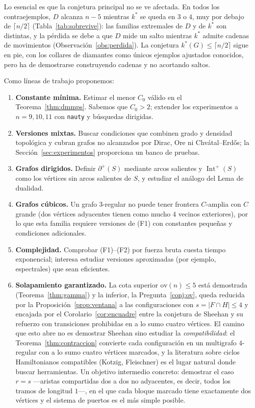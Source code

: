 \documentclass[11pt,a4paper]{article}
\theoremstyle{definition}
\theoremstyle{remark}
\newcommand{\Int}{\operatorname{Int}}
\begin{document}
Lo esencial es que la conjetura principal no se ve afectada. En todos los contraejemplos, $D$ alcanza $n-5$ mientras $k^*$ se queda en $3$ o $4$, muy por debajo de $\lceil n/2\rceil$ (Tabla~\ref{tab:sobrevive}): las familias extremales de $D$ y de $k^*$ son distintas, y la pérdida se debe a que $D$ mide un salto mientras $k^*$ admite cadenas de movimientos (Observación~\ref{obs:perdida}). La conjetura $k^*(G)\le\lceil n/2\rceil$ sigue en pie, con los collares de diamantes como únicos ejemplos ajustados conocidos, pero ha de demostrarse construyendo cadenas y no acortando saltos.

Como líneas de trabajo proponemos:
\begin{enumerate}
\item \textbf{Constante mínima.} Estimar el menor $C_0$ válido en el Teorema~\ref{thm:dmmps}. Sabemos que $C_0>2$; extender los experimentos a $n=9,10,11$ con \texttt{nauty} y búsquedas dirigidas.
\item \textbf{Versiones mixtas.} Buscar condiciones que combinen grado y densidad topológica y cubran grafos no alcanzados por Dirac, Ore ni Chvátal--Erdős; la Sección~\ref{sec:experimentos} proporciona un banco de pruebas.
\item \textbf{Grafos dirigidos.} Definir $\partial^+(S)$ mediante arcos salientes y $\Int^+(S)$ como los vértices sin arcos salientes de $S$, y estudiar el análogo del Lema de dualidad.
\item \textbf{Grafos cúbicos.} Un grafo $3$-regular no puede tener frontera $C$-amplia con $C$ grande (dos vértices adyacentes tienen como mucho $4$ vecinos exteriores), por lo que esta familia requiere versiones de (F1) con constantes pequeñas y condiciones adicionales.
\item \textbf{Complejidad.} Comprobar (F1)--(F2) por fuerza bruta cuesta tiempo exponencial; interesa estudiar versiones aproximadas (por ejemplo, espectrales) que sean eficientes.
\item \textbf{Solapamiento garantizado.} La cota superior $\mathrm{ov}(n)\le5$ está demostrada (Teorema~\ref{thm:gamma}) y la inferior, la Pregunta~\ref{conj:ov}, queda reducida por la Proposición~\ref{prop:ventana} a las configuraciones con $s=|F\cap H|\le4$ y encajada por el Corolario~\ref{cor:encuadre} entre la conjetura de Sheehan y su refuerzo con transiciones prohibidas en a lo sumo cuatro vértices. El camino que esto abre no es demostrar Sheehan sino estudiar la \emph{compatibilidad}: el Teorema~\ref{thm:contraccion} convierte cada configuración en un multigrafo $4$-regular con a lo sumo cuatro vértices marcados, y la literatura sobre ciclos Hamiltonianos compatibles (Kotzig, Fleischner) es el lugar natural donde buscar herramientas. Un objetivo intermedio concreto: demostrar el caso $r=s$ —aristas compartidas dos a dos no adyacentes, es decir, todos los tramos de longitud $1$—, en el que cada bloque marcado tiene exactamente dos vértices y el sistema de puertos es el más simple posible.

\end{enumerate}
\end{document}
